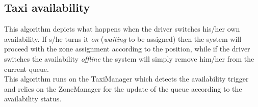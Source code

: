 \documentclass[a4paper,11pt]{report} %
\begin{document}
	\pagebreak
	
	\subsection{Taxi availability} \label{sec:AlgoAvailability}
	This algorithm depicts what happens when the driver switches his/her own availability. If s/he turns it \textit{on} (\textit{waiting} to be assigned) then the system will proceed with the zone assignment according to the position, while if the driver switches the availability \textit{offline} the system will simply remove him/her from the current queue.\\
	This algorithm runs on the TaxiManager which detects the availability trigger and relies on the ZoneManager for the update of the queue according to the availability status.\\
	
	\begin{minipage}{\linewidth}
	\end{minipage}		
	
\end{document}
